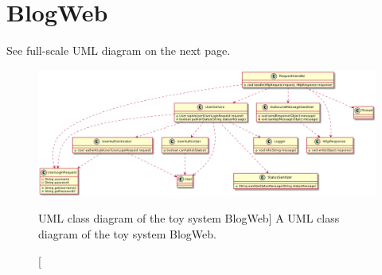 \chapter{BlogWeb} \label{apx:blogweb}

See full-scale UML diagram on the next page.

\begin{figure}
    \includegraphics[width=\textwidth]{figure/ToyAppFull.png}
    \captionsetup{justification=centering}
    \caption
        [UML class diagram of the toy system BlogWeb]
        {A UML class diagram of the toy system BlogWeb.}
\end{figure}